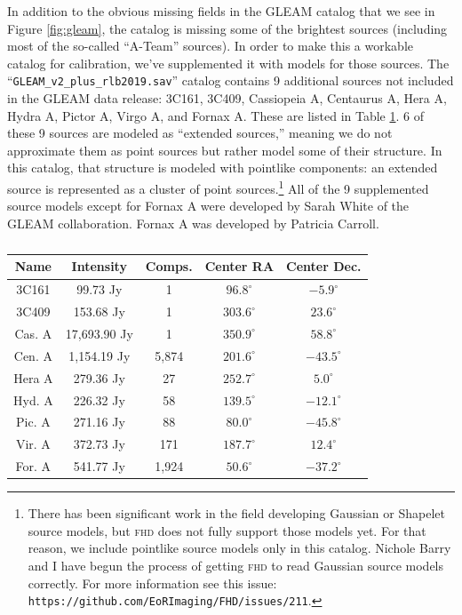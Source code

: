 \documentclass[a4paper,11pt]{article}
\begin{document}
In addition to the obvious missing fields in the GLEAM catalog that we see in Figure \ref{fig:gleam}, the catalog is missing some of the brightest sources (including most of the so-called ``A-Team'' sources). In order to make this a workable catalog for calibration, we've supplemented it with models for those sources. The ``\texttt{GLEAM\_v2\_plus\_rlb2019.sav}'' catalog contains 9 additional sources not included in the GLEAM data release: 3C161, 3C409, Cassiopeia A, Centaurus A, Hera A, Hydra A, Pictor A, Virgo A, and Fornax A. These are listed in Table \ref{table}. 6 of these 9 sources are modeled as ``extended sources,'' meaning we do not approximate them as point sources but rather model some of their structure. In this catalog, that structure is modeled with pointlike components: an extended source is represented as a cluster of point sources.\footnote{There has been significant work in the field developing Gaussian or Shapelet source models, but \textsc{fhd} does not fully support those models yet. For that reason, we include pointlike source models only in this catalog. Nichole Barry and I have begun the process of getting \textsc{fhd} to read Gaussian source models correctly. For more information see this issue: \texttt{https://github.com/EoRImaging/FHD/issues/211}.} All of the 9 supplemented source models except for Fornax A were developed by Sarah White of the GLEAM collaboration. Fornax A was developed by Patricia Carroll.

\begin{table}
\centering
\begin{tabular}{ |c|c|c|c|c| } 
 \hline
 \textbf{Name} & \textbf{Intensity} & \textbf{Comps.} & \textbf{Center RA} & \textbf{Center Dec.} \\ 
 \hline
 3C161 & 99.73 Jy & 1 & $96.8^\circ$ & $-5.9^\circ$ \\
 \hline 
 3C409 & 153.68 Jy & 1 & $303.6^\circ$ & $23.6^\circ$ \\
 \hline
 Cas. A & 17,693.90 Jy & 1 & $350.9^\circ$ & $58.8^\circ$ \\
 \hline
 Cen. A & 1,154.19 Jy & 5,874 & $201.6^\circ$ & $-43.5^\circ$ \\
 \hline
 Hera A & 279.36 Jy & 27 & $252.7^\circ$ & $5.0^\circ$ \\
 \hline
 Hyd. A & 226.32 Jy & 58 & $139.5^\circ$ & $-12.1^\circ$ \\
 \hline
 Pic. A & 271.16 Jy & 88 & $80.0^\circ$ & $-45.8^\circ$ \\
 \hline
 Vir. A & 372.73 Jy & 171 & $187.7^\circ$ & $12.4^\circ$ \\
 \hline
 For. A & 541.77 Jy & 1,924 & $50.6^\circ$ & $-37.2^\circ$ \\
 \hline
\end{tabular}
\caption{}
\label{table}
\end{table}
\end{document}
